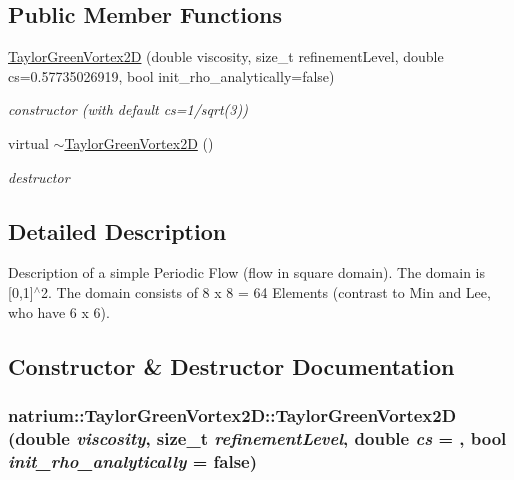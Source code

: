 \subsection*{Public Member Functions}
\begin{DoxyCompactItemize}
\item 
\hyperlink{classnatrium_1_1TaylorGreenVortex2D_a48410d029b8a0f9801b66efda45aa77f}{TaylorGreenVortex2D} (double viscosity, size\_\-t refinementLevel, double cs=0.57735026919, bool init\_\-rho\_\-analytically=false)
\begin{DoxyCompactList}\small\item\em constructor (with default cs=1/sqrt(3)) \item\end{DoxyCompactList}\item 
\hypertarget{classnatrium_1_1TaylorGreenVortex2D_abb6099f4f9791f7decabb35ccd3dbe49}{
virtual \hyperlink{classnatrium_1_1TaylorGreenVortex2D_abb6099f4f9791f7decabb35ccd3dbe49}{$\sim$TaylorGreenVortex2D} ()}
\label{classnatrium_1_1TaylorGreenVortex2D_abb6099f4f9791f7decabb35ccd3dbe49}

\begin{DoxyCompactList}\small\item\em destructor \item\end{DoxyCompactList}\end{DoxyCompactItemize}


\subsection{Detailed Description}
Description of a simple Periodic Flow (flow in square domain). The domain is \mbox{[}0,1\mbox{]}$^\wedge$2. The domain consists of 8 x 8 = 64 Elements (contrast to Min and Lee, who have 6 x 6). 

\subsection{Constructor \& Destructor Documentation}
\hypertarget{classnatrium_1_1TaylorGreenVortex2D_a48410d029b8a0f9801b66efda45aa77f}{
\subsubsection[{TaylorGreenVortex2D}]{\setlength{\rightskip}{0pt plus 5cm}natrium::TaylorGreenVortex2D::TaylorGreenVortex2D (double {\em viscosity}, \/  size\_\-t {\em refinementLevel}, \/  double {\em cs} = {}, \/  bool {\em init\_\-rho\_\-analytically} = {\ttfamily false})}}
\label{classnatrium_1_1TaylorGreenVortex2D_a48410d029b8a0f9801b66efda45aa77f}



